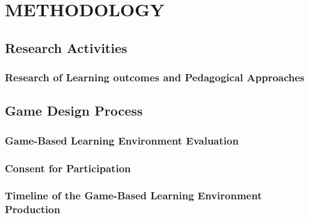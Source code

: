 \chapter{METHODOLOGY}

\section{Research Activities}

\subsection{Research of Learning outcomes and Pedagogical Approaches}



\section{Game Design Process}


\subsection{Game-Based Learning Environment Evaluation}


\subsection{Consent for Participation}


\subsection{Timeline of the Game-Based Learning Environment Production}

